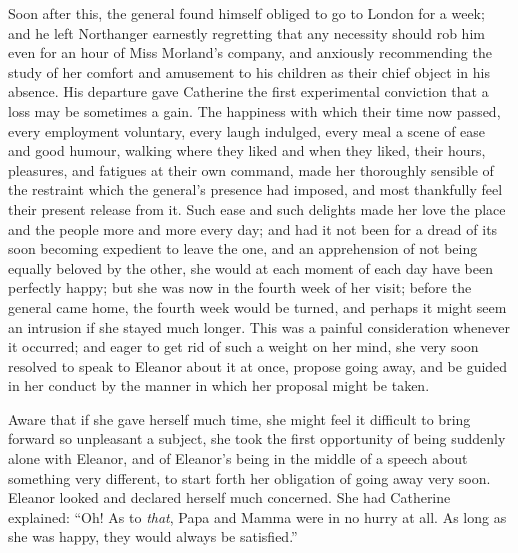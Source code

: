 Soon after this, the general found himself obliged to go to London for a week; and he left Northanger earnestly regretting that any necessity should rob him even for an hour of Miss Morland's company, and anxiously recommending the study of her comfort and amusement to his children as their chief object in his absence. His departure gave Catherine the first experimental conviction that a loss may be sometimes a gain. The happiness with which their time now passed, every employment voluntary, every laugh indulged, every meal a scene of ease and good humour, walking where they liked and when they liked, their hours, pleasures, and fatigues at their own command, made her thoroughly sensible of the restraint which the general's presence had imposed, and most thankfully feel their present release from it. Such ease and such delights made her love the place and the people more and more every day; and had it not been for a dread of its soon becoming expedient to leave the one, and an apprehension of not being equally beloved by the other, she would at each moment of each day have been perfectly happy; but she was now in the fourth week of her visit; before the general came home, the fourth week would be turned, and perhaps it might seem an intrusion if she stayed much longer. This was a painful consideration whenever it occurred; and eager to get rid of such a weight on her mind, she very soon resolved to speak to Eleanor about it at once, propose going away, and be guided in her conduct by the manner in which her proposal might be taken.

Aware that if she gave herself much time, she might feel it difficult to bring forward so unpleasant a subject, she took the first opportunity of being suddenly alone with Eleanor, and of Eleanor's being in the middle of a speech about something very different, to start forth her obligation of going away very soon. Eleanor looked and declared herself much concerned. She had  Catherine explained: “Oh! As to {\em that}, Papa and Mamma were in no hurry at all. As long as she was happy, they would always be satisfied.”


